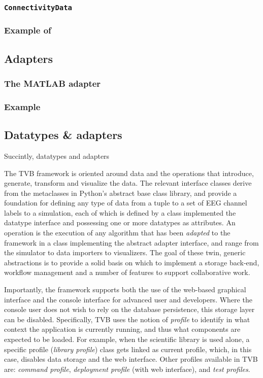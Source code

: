 \documentclass{bioinfo}
\begin{document}
\subsubsection{\texttt{ConnectivityData}}
\subsubsection{Example of \texttt{}}
\subsection{Adapters}
\subsubsection{The MATLAB adapter}
\subsubsection{Example}


\subsection{Datatypes \& adapters}

Succintly, datatypes and adapters 

The TVB framework is oriented around data and the operations that introduce,
generate, transform and visualize the data. The relevant interface classes
derive from the metaclasses in Python's abstract base class library, and
provide a foundation for defining any type of data from a tuple to a
set of EEG channel labels to a simulation, each of which is defined by a class
implemented the datatype interface and possessing one or more datatypes as 
attributes. An operation is the execution of any algorithm that
has been \emph{adapted} to the framework in a class implementing the abstract
adapter interface, and range from the simulator to data importers to
visualizers.  The goal of these twin, generic abstractions is to provide a
solid basis on which to implement a storage back-end, workflow management and a
number of features to support collaborative work. 

Importantly, the framework supports both the use of the web-based graphical
interface and the console interface for advanced user and developers. Where the
console user does not wish to rely on the database persistence, this storage
layer can be disabled. Specifically, TVB uses the notion of \emph{profile} to
identify in what context the application is currently running, and thus what
components are expected to be loaded.  For example, when the scientific library
is used alone, a specific profile (\emph{library profile}) class gets linked as
current profile, which, in this case, disables data storage and the web
interface. Other profiles available in TVB are: \emph{command profile},
\emph{deployment profile} (with web interface), and \emph{test profiles}.
\end{document}
